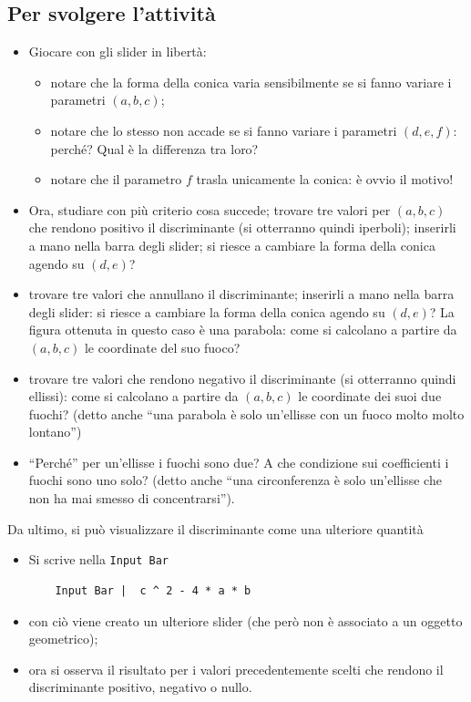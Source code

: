 \documentclass{amsart}
\begin{document}
\subsection{Per svolgere l'attività}
\begin{itemize}
  \item Giocare con gli slider in libertà: 
  \begin{itemize}
    \item notare che la forma della conica varia sensibilmente se si fanno variare i parametri $(a,b,c)$; 
    \item notare che lo stesso non accade se si fanno variare i parametri $(d,e,f)$: perché? Qual è la differenza tra loro?
    \item notare che il parametro $f$ trasla unicamente la conica: è ovvio il motivo!
  \end{itemize}
  \item Ora, studiare con più criterio cosa succede; trovare tre valori per $(a,b,c)$ che rendono positivo il discriminante (si otterranno quindi iperboli); inserirli a mano nella barra degli slider; si riesce a cambiare la forma della conica agendo su $(d,e)$?
  \item trovare tre valori che annullano il discriminante; inserirli a mano nella barra degli slider: si riesce a cambiare la forma della conica agendo su $(d,e)$? La figura ottenuta in questo caso è una parabola: come si calcolano a partire da $(a,b,c)$ le coordinate del suo fuoco?
  \item trovare tre valori che rendono negativo il discriminante (si otterranno quindi ellissi): come si calcolano a partire da $(a,b,c)$ le coordinate dei suoi due fuochi? (detto anche ``una parabola è solo un'ellisse con un fuoco molto molto lontano'')
  \item ``Perché'' per un'ellisse i fuochi sono due? A che condizione sui coefficienti i fuochi sono uno solo? (detto anche ``una circonferenza è solo un'ellisse che non ha mai smesso di concentrarsi'').
\end{itemize}
Da ultimo, si può visualizzare il discriminante come una ulteriore quantità
\begin{itemize}
  \item Si scrive nella {\tt Input Bar}
  \begin{verbatim}
    Input Bar |  c ^ 2 - 4 * a * b
  \end{verbatim}
  \item con ciò viene creato un ulteriore slider (che però non è associato a un oggetto geometrico);
  \item ora si osserva il risultato per i valori precedentemente scelti che rendono il discriminante positivo, negativo o nullo.
\end{itemize}
\end{document}
